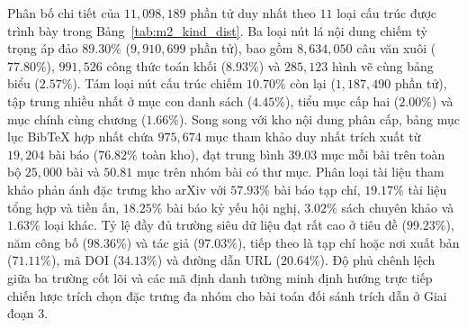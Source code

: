 Phân bố chi tiết của $11{,}098{,}189$ phần tử duy nhất theo $11$ loại cấu trúc được trình bày trong Bảng~\ref{tab:m2_kind_dist}. Ba loại nút lá nội dung chiếm tỷ trọng áp đảo $89.30\%$ ($9{,}910{,}699$ phần tử), bao gồm $8{,}634{,}050$ câu văn xuôi ($77.80\%$), $991{,}526$ công thức toán khối ($8.93\%$) và $285{,}123$ hình vẽ cùng bảng biểu ($2.57\%$). Tám loại nút cấu trúc chiếm $10.70\%$ còn lại ($1{,}187{,}490$ phần tử), tập trung nhiều nhất ở mục con danh sách ($4.45\%$), tiểu mục cấp hai ($2.00\%$) và mục chính cùng chương ($1.66\%$). Song song với kho nội dung phân cấp, bảng mục lục BibTeX hợp nhất chứa $975{,}674$ mục tham khảo duy nhất trích xuất từ $19{,}204$ bài báo ($76.82\%$ toàn kho), đạt trung bình $39.03$ mục mỗi bài trên toàn bộ $25{,}000$ bài và $50.81$ mục trên nhóm bài có thư mục. Phân loại tài liệu tham khảo phản ánh đặc trưng kho arXiv với $57.93\%$ bài báo tạp chí, $19.17\%$ tài liệu tổng hợp và tiền ấn, $18.25\%$ bài báo kỷ yếu hội nghị, $3.02\%$ sách chuyên khảo và $1.63\%$ loại khác. Tỷ lệ đầy đủ trường siêu dữ liệu đạt rất cao ở tiêu đề ($99.23\%$), năm công bố ($98.36\%$) và tác giả ($97.03\%$), tiếp theo là tạp chí hoặc nơi xuất bản ($71.11\%$), mã DOI ($34.13\%$) và đường dẫn URL ($20.64\%$). Độ phủ chênh lệch giữa ba trường cốt lõi và các mã định danh tường minh định hướng trực tiếp chiến lược trích chọn đặc trưng đa nhóm cho bài toán đối sánh trích dẫn ở Giai đoạn 3.

